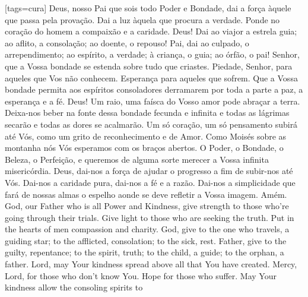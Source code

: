 {\begin{songs}{}
    \sclearpage
    [tags={cura}]
      \beginverse
        Deus, nosso Pai que sois todo Poder e Bondade, dai
        a força àquele que passa pela provação.
        \ind Dai a luz àquela que procura a verdade.
        \ind Ponde no coração do homem a compaixão e a caridade.
        \ind Deus! Dai ao viajor a estrela guia; ao aflito,
        a consolação; ao doente, o repouso!
        \ind Pai, dai ao culpado, o arrependimento; ao espírito,
        a verdade; à criança, o guia; ao órfão, o pai!
        \ind Senhor, que a Vossa bondade se estenda sobre tudo
        que criastes.
        \ind Piedade, Senhor, para aqueles que Vos não conhecem.
        \ind Esperança para aqueles que sofrem.
        \ind Que a Vossa bondade permita aos espíritos
        consoladores derramarem por toda a parte a paz, a
        esperança e a fé.
        \ind Deus! Um raio, uma faísca do Vosso amor pode abraçar
        a terra.
        \ind Deixa-nos beber na fonte dessa bondade fecunda
        e infinita e todas as lágrimas secarão e todas as
        dores se acalmarão.
        \ind Um só coração, um só pensamento subirá até Vós,
        como um grito de reconhecimento e de Amor.
        \ind Como Moisés sobre as montanha nós Vós esperamos
        com os braços abertos.
        \ind O Poder, o Bondade, o Beleza, o Perfeição, e
        queremos de alguma sorte merecer a Vossa infinita
        misericórdia.
        \ind Deus, dai-nos a força de ajudar o progresso a fim
        de subir-nos até Vós.
        \ind Dai-nos a caridade pura, dai-nos a fé e a razão.
        \ind Dai-nos a simplicidade que fará de nossas almas o
        espelho aonde se deve refletir a Vossa imagem.
        \parspace
        Amém.
      \endverse
      \brk
      \vspace*{-1.1em}
      \beginverse
        God, our Father who is all Power and Kindness,
        give strength to those who're going through
        their trials.
        \ind Give light to those who are seeking the truth.
        \ind Put in the hearts of men compassion and charity.
        \ind God, give to the one who travels, a guiding star;
        to the afflicted, consolation; to the sick, rest.
        \ind Father, give to the guilty, repentance; to the
        spirit, truth; to the child, a guide; to the orphan,
        a father.
        \ind Lord, may Your kindness spread above all that You
        have created.
        \ind Mercy, Lord, for those who don't know You.
        \ind Hope for those who suffer.
        \ind May Your kindness allow the consoling spirits to

\end{songs}}
